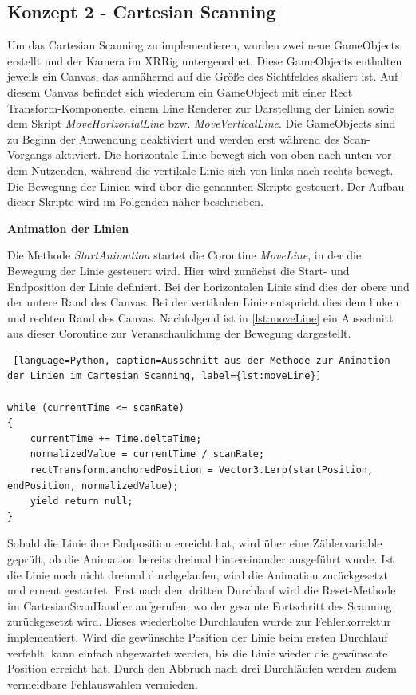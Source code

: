 \subsection{Konzept 2 - Cartesian Scanning}

Um das Cartesian Scanning zu implementieren, wurden zwei neue GameObjects erstellt und der Kamera im XRRig untergeordnet. Diese GameObjects enthalten jeweils ein Canvas, das annähernd auf die Größe des Sichtfeldes skaliert ist. Auf diesem Canvas befindet sich wiederum ein GameObject mit einer Rect Transform-Komponente, einem Line Renderer zur Darstellung der Linien sowie dem Skript \textit{MoveHorizontalLine} bzw. \textit{MoveVerticalLine}. Die GameObjects sind zu Beginn der Anwendung deaktiviert und werden erst während des Scan-Vorgangs aktiviert.
Die horizontale Linie bewegt sich von oben nach unten vor dem Nutzenden, während die vertikale Linie sich von links nach rechts bewegt. Die Bewegung der Linien wird über die genannten Skripte gesteuert. Der Aufbau dieser Skripte wird im Folgenden näher beschrieben. 

\textbf{Animation der Linien}

Die Methode \textit{StartAnimation} startet die Coroutine \textit{MoveLine}, in der die Bewegung der Linie gesteuert wird. Hier wird zunächst die Start- und Endposition der Linie definiert. Bei der horizontalen Linie sind dies der obere und der untere Rand des Canvas. Bei der vertikalen Linie entspricht dies dem linken und rechten Rand des Canvas. Nachfolgend ist in \autoref{lst:moveLine} ein Ausschnitt aus dieser Coroutine zur Veranschaulichung der Bewegung dargestellt. 

\begin{lstlisting} [language=Python, caption=Ausschnitt aus der Methode zur Animation der Linien im Cartesian Scanning, label={lst:moveLine}]

while (currentTime <= scanRate)
{
    currentTime += Time.deltaTime;
    normalizedValue = currentTime / scanRate;
    rectTransform.anchoredPosition = Vector3.Lerp(startPosition, endPosition, normalizedValue);
    yield return null;
}
\end{lstlisting}

Sobald die Linie ihre Endposition erreicht hat, wird über eine Zählervariable geprüft, ob die Animation bereits dreimal hintereinander ausgeführt wurde. Ist die Linie noch nicht dreimal durchgelaufen, wird die Animation zurückgesetzt und erneut gestartet. Erst nach dem dritten Durchlauf wird die Reset-Methode im CartesianScanHandler aufgerufen, wo der gesamte Fortschritt des Scanning zurückgesetzt wird. Dieses wiederholte Durchlaufen wurde zur Fehlerkorrektur implementiert. Wird die gewünschte Position der Linie beim ersten Durchlauf verfehlt, kann einfach abgewartet werden, bis die Linie wieder die gewünschte Position erreicht hat. Durch den Abbruch nach drei Durchläufen werden zudem vermeidbare Fehlauswahlen vermieden.

